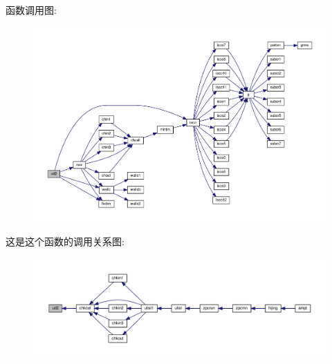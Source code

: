 函数调用图\+:
\nopagebreak
\begin{figure}[H]
\begin{center}
\leavevmode
\includegraphics[width=350pt]{ud2_8f90_ab93c42d493b8c2886b6ba6984f9dd69f_cgraph}
\end{center}
\end{figure}
这是这个函数的调用关系图\+:
\nopagebreak
\begin{figure}[H]
\begin{center}
\leavevmode
\includegraphics[width=350pt]{ud2_8f90_ab93c42d493b8c2886b6ba6984f9dd69f_icgraph}
\end{center}
\end{figure}
